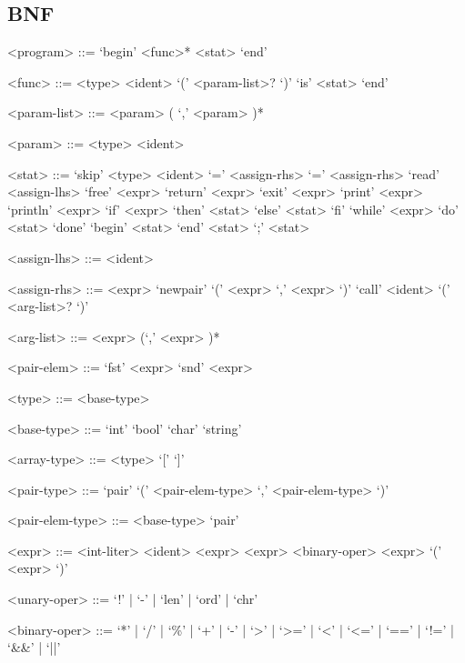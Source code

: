 \documentclass[a4paper]{article}
\theoremstyle{definition}
\begin{document}
\subsection{BNF}
\begin{grammar}
  <program> ::= `begin' <func>* <stat> `end' 

  <func> ::= <type> <ident> `(' <param-list>? `)' `is' <stat> `end'

  <param-list> ::= <param> ( `,' <param> )*   

  <param> ::= <type> <ident>    
  
  <stat>  ::= `skip'
    \alt <type> <ident> `=' <assign-rhs> 
     `=' <assign-rhs> 
    \alt `read' <assign-lhs>
    \alt `free' <expr>    
    \alt `return' <expr>
    \alt `exit' <expr>
    \alt `print' <expr> 
    \alt `println' <expr>      
    \alt `if' <expr> `then' <stat> `else' <stat> `fi'
    \alt `while' <expr> `do' <stat> `done'     
    \alt `begin' <stat> `end'    
    \alt <stat> `;' <stat> 

  <assign-lhs> ::= <ident>
    
  <assign-rhs> ::= <expr>
    \alt `newpair' `(' <expr> `,' <expr> `)'
    \alt `call' <ident> `(' <arg-list>? `)'
    
  <arg-list> ::= <expr> (`,' <expr> )*    
  
  <pair-elem> ::= `fst' <expr>
    \alt `snd' <expr>

  <type> ::= <base-type>

  <base-type> ::= `int' 
    \alt `bool'
    \alt `char'
    \alt `string'    

  <array-type> ::= <type> `[' `]'   
    
  <pair-type> ::= `pair' `(' <pair-elem-type> `,' <pair-elem-type> `)'

  <pair-elem-type> ::= <base-type> 
    \alt `pair'

  <expr> ::= <int-liter>
    \alt <ident>
     <expr>
    \alt <expr> <binary-oper> <expr>
    \alt `(' <expr> `)'    
    
  <unary-oper> ::= `!' | `-' | `len' | `ord' | `chr' 

  <binary-oper> ::= `*' | `/' | `\%' | `+' | `-' | `>' | `>=' | `<' | `<=' | `==' | `!=' | `&&' | `||'         


\end{grammar}
\end{document}
